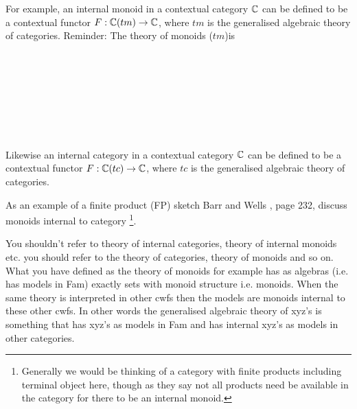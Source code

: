\note
For example, an internal monoid in a contextual category $\ccat[C]$
can be defined to be a contextual functor $F: \ccat[C](tm) \morph  \ccat[C]$, where $tm$ is the generalised algebraic theory of categories.
Reminder: The theory of monoids ($tm$)is
\begin{gatrules}
\gatintros
{}
 \\
 \\
 \\
\gataxioms

\begin{gatgroup}{}
 \\
\end{gatgroup} \\
\end{gatrules}

\note 
Likewise an internal category in a contextual category $\ccat[C]$
can be defined to be a contextual functor $F: \ccat[C](tc) \morph  \ccat[C]$, where $tc$ is the generalised algebraic theory of categories.



\note
As an example of a finite product (FP) sketch Barr and Wells \cite{BarrandWells}, page 232, discuss monoids internal to  category
\footnote{Generally we would be thinking of a category with finite products including terminal object here, though as they say not all products need be available in the category for there to be an internal monoid.}.

\begin{notebox}
You  shouldn't refer to theory of internal categories, theory of internal monoids etc. you should refer to the
theory of categories, theory of monoids and so on. What you have defined as the theory of monoids for example has
as algebras (i.e. has models in Fam) exactly sets with monoid structure i.e. monoids. When the same theory is interpreted in other cwfs then
the models are monoids internal to these other cwfs. In other words the generalised algebraic theory of xyz's is something that has xyz's as models in Fam and has internal xyz's as models in other categories. 
\end{notebox}


